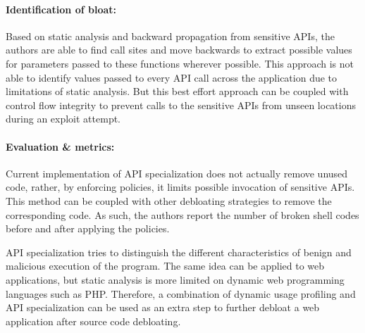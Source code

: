 \paragraph{Identification of bloat:} Based on static analysis and backward propagation from sensitive APIs, the authors are able to find call sites and move backwards to extract possible values for parameters passed to these functions wherever possible. This approach is not able to identify values passed to every API call across the application due to limitations of static analysis. But this best effort approach can be coupled with control flow integrity to prevent calls to the sensitive APIs from unseen locations during an exploit attempt.
\paragraph{Evaluation \& metrics:} Current implementation of API specialization does not actually remove unused code, rather, by enforcing policies, it limits possible invocation of sensitive APIs. This method can be coupled with other debloating strategies to remove the corresponding code. As such, the authors report the number of broken shell codes before and after applying the policies.

API specialization tries to distinguish the different characteristics of benign and malicious execution of the program. The same idea can be applied to web applications, but static analysis is more limited on dynamic web programming languages such as PHP. Therefore, a combination of dynamic usage profiling and API specialization can be used as an extra step to further debloat a web application after source code debloating.
